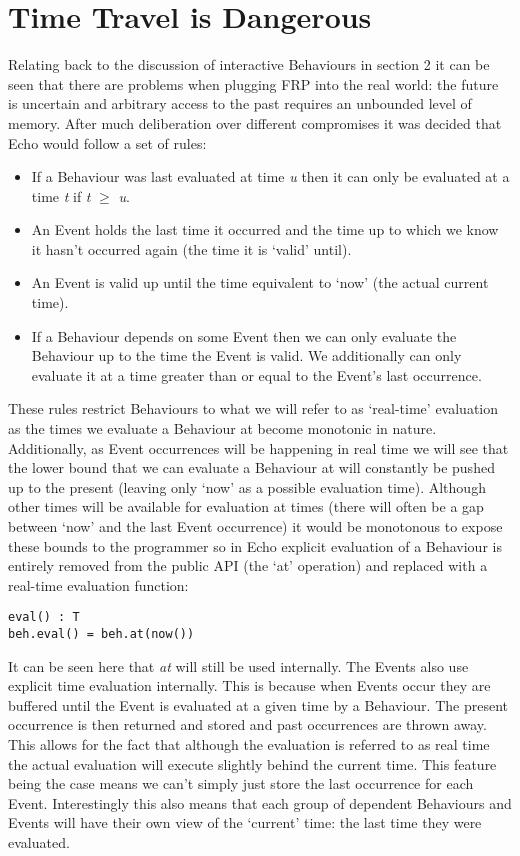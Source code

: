   \section{Time Travel is Dangerous}
    Relating back to the discussion of interactive Behaviours in section 2 it can be seen
    that there are problems when plugging FRP into the real world: the future is uncertain and
    arbitrary access to the past requires an unbounded level of memory. After much deliberation
    over different compromises it was decided that Echo would follow a set of rules:
    
    \begin{itemize}
      \item If a Behaviour was last evaluated at time \emph{u} then it can only be evaluated at
      a time \emph{t} if \emph{t} $\geq$ \emph{u}.
      \item An Event holds the last time it occurred and the time up to which we know it hasn't occurred
      again (the time it is `valid' until).
      \item An Event is valid up until the time equivalent to `now' (the actual current time).
      \item If a Behaviour depends on some Event then we can only evaluate the Behaviour up to
      the time the Event is valid. We additionally can only evaluate it at a time greater than
      or equal to the Event's last occurrence.
    \end{itemize}
    
    These rules restrict Behaviours to what we will refer to as `real-time' evaluation as the times
    we evaluate a Behaviour at become monotonic in nature. Additionally, as Event occurrences will
    be happening in real time we will see that the lower bound that we can evaluate a Behaviour at will
    constantly be pushed up to the present (leaving only `now' as a possible evaluation time). Although
    other times will be available for evaluation at times (there will often be a gap between `now' and
    the last Event occurrence) it would be monotonous to expose these bounds to the programmer so
    in Echo explicit evaluation of a Behaviour is entirely removed from the public API (the
    `at' operation) and replaced with a real-time evaluation function:

\begin{verbatim}
eval() : T
beh.eval() = beh.at(now())
\end{verbatim}  

    It can be seen here that \emph{at} will still be used internally. The Events also use explicit time
    evaluation internally. This is because when Events occur they are buffered until the Event is
    evaluated at a given time by a Behaviour. The present occurrence is then returned and stored and past occurrences
    are thrown away. This allows for the fact that although the evaluation is referred to as real time the
    actual evaluation will execute slightly behind the current time. This feature being the
    case means we can't simply just store the last occurrence for each Event. Interestingly this also
    means that each group of dependent Behaviours and Events will have their own view of the `current' time:
    the last time they were evaluated.

